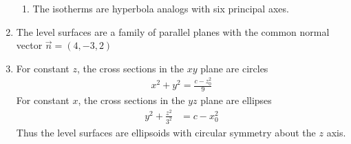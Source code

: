 \begin{enumerate}
\begin{enumerate}
              \item The isotherms are hyperbola analogs with six principal axes.
                    \begin{figure}[H]
                        \centering
                    \end{figure}
          \end{enumerate}

    \item The level surfaces are a family of parallel planes with the common
          normal vector $ \vec{n} = (4, -3, 2) $

    \item For constant $ z $, the cross sections in the $ xy $ plane are circles
          \begin{align}
              x^2 + y^2 = \frac{c - z_0^2}{9}
          \end{align}
          For constant $ x $, the cross sections in the $ yz $ plane are ellipses
          \begin{align}
              y^2 + \frac{z^2}{3^2} & = c - x_0^2
          \end{align}
          Thus the level surfaces are ellipsoids with circular symmetry about the $ z $
          axis.


\end{enumerate}
